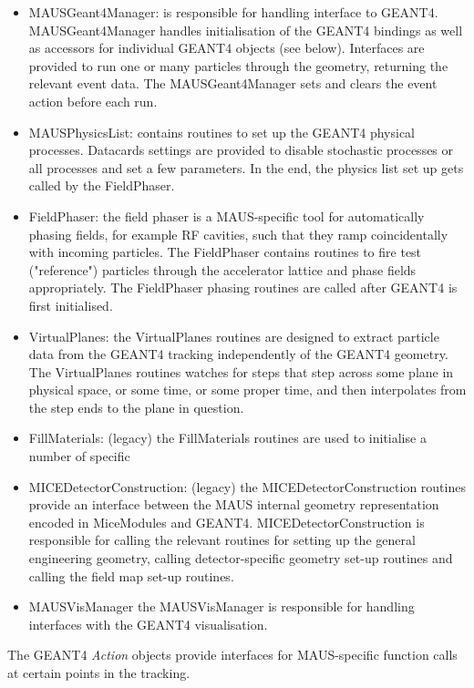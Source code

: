 \begin{itemize}
\item MAUSGeant4Manager: is responsible for handling interface to GEANT4. MAUSGeant4Manager handles initialisation of the GEANT4 bindings as well as accessors for individual GEANT4 objects (see below). Interfaces are provided to run one or many particles through the geometry, returning the relevant event data. The MAUSGeant4Manager sets and clears the event action before each run.
\item MAUSPhysicsList: contains routines to set up the GEANT4 physical processes. Datacards settings are provided to disable stochastic processes or all processes and set a few parameters. In the end, the physics list set up gets called by the FieldPhaser.
\item FieldPhaser: the field phaser is a MAUS-specific tool for automatically phasing fields, for example RF cavities, such that they ramp coincidentally with incoming particles. The FieldPhaser contains routines to fire test ("reference") particles through the accelerator lattice and phase fields appropriately. The FieldPhaser phasing routines are called after GEANT4 is first initialised.
\item VirtualPlanes: the VirtualPlanes routines are designed to extract particle data from the GEANT4 tracking independently of the GEANT4 geometry. The VirtualPlanes routines watches for steps that step across some plane in physical space, or some time, or some proper time, and then interpolates from the step ends to the plane in question.
\item FillMaterials: (legacy) the FillMaterials routines are used to initialise a number of specific 
\item MICEDetectorConstruction: (legacy) the MICEDetectorConstruction routines provide an interface between the MAUS internal geometry representation encoded in MiceModules and GEANT4. MICEDetectorConstruction is responsible for calling the relevant routines for setting up the general engineering geometry, calling detector-specific geometry set-up routines and calling the field map set-up routines.
\item MAUSVisManager the MAUSVisManager is responsible for handling interfaces with the GEANT4 visualisation.
\end{itemize}

The GEANT4 \emph{Action} objects provide interfaces for MAUS-specific function calls at certain points in the tracking.

